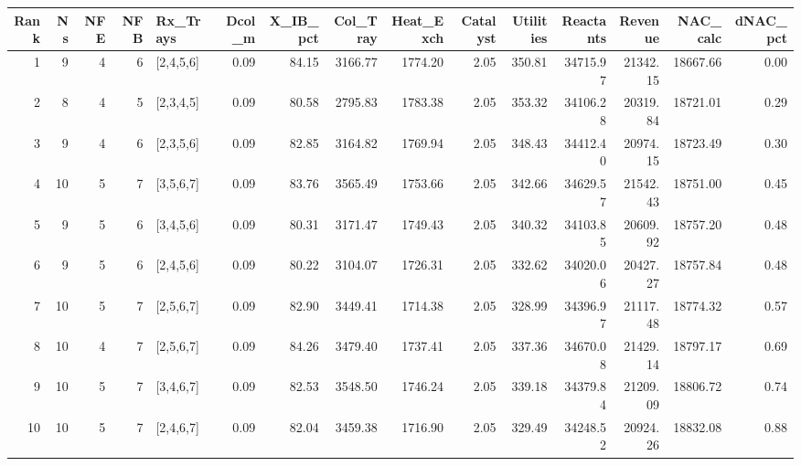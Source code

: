 \begin{tabular}{rrrrlrrrrrrrrrr}
\toprule
Rank & Ns & NFE & NFB & Rx_Trays & Dcol_m & X_IB_pct & Col_Tray & Heat_Exch & Catalyst & Utilities & Reactants & Revenue & NAC_calc & dNAC_pct \\
\midrule
1 & 9 & 4 & 6 & [2,4,5,6] & 0.09 & 84.15 & 3166.77 & 1774.20 & 2.05 & 350.81 & 34715.97 & 21342.15 & 18667.66 & 0.00 \\
2 & 8 & 4 & 5 & [2,3,4,5] & 0.09 & 80.58 & 2795.83 & 1783.38 & 2.05 & 353.32 & 34106.28 & 20319.84 & 18721.01 & 0.29 \\
3 & 9 & 4 & 6 & [2,3,5,6] & 0.09 & 82.85 & 3164.82 & 1769.94 & 2.05 & 348.43 & 34412.40 & 20974.15 & 18723.49 & 0.30 \\
4 & 10 & 5 & 7 & [3,5,6,7] & 0.09 & 83.76 & 3565.49 & 1753.66 & 2.05 & 342.66 & 34629.57 & 21542.43 & 18751.00 & 0.45 \\
5 & 9 & 5 & 6 & [3,4,5,6] & 0.09 & 80.31 & 3171.47 & 1749.43 & 2.05 & 340.32 & 34103.85 & 20609.92 & 18757.20 & 0.48 \\
6 & 9 & 5 & 6 & [2,4,5,6] & 0.09 & 80.22 & 3104.07 & 1726.31 & 2.05 & 332.62 & 34020.06 & 20427.27 & 18757.84 & 0.48 \\
7 & 10 & 5 & 7 & [2,5,6,7] & 0.09 & 82.90 & 3449.41 & 1714.38 & 2.05 & 328.99 & 34396.97 & 21117.48 & 18774.32 & 0.57 \\
8 & 10 & 4 & 7 & [2,5,6,7] & 0.09 & 84.26 & 3479.40 & 1737.41 & 2.05 & 337.36 & 34670.08 & 21429.14 & 18797.17 & 0.69 \\
9 & 10 & 5 & 7 & [3,4,6,7] & 0.09 & 82.53 & 3548.50 & 1746.24 & 2.05 & 339.18 & 34379.84 & 21209.09 & 18806.72 & 0.74 \\
10 & 10 & 5 & 7 & [2,4,6,7] & 0.09 & 82.04 & 3459.38 & 1716.90 & 2.05 & 329.49 & 34248.52 & 20924.26 & 18832.08 & 0.88 \\
\bottomrule
\end{tabular}
